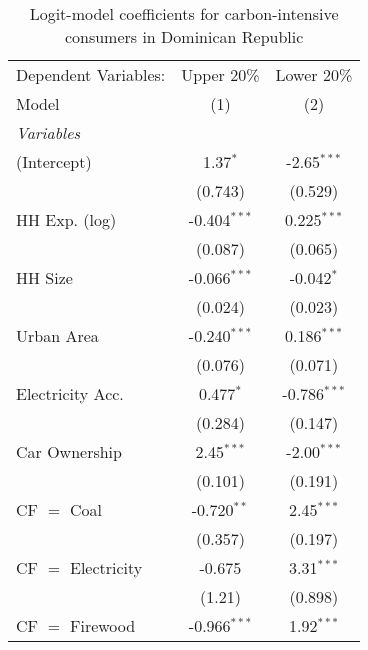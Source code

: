 
\begin{table}[htbp!]
   \centering
   \small
   \begin{adjustbox}{width = 1\textwidth, max height = 0.95\textheight, center}
      \begin{threeparttable}[b]
         \caption{\label{tab:Logit_1_DOM} Logit-model coefficients for carbon-intensive consumers in Dominican Republic}
         \begin{tabular}{lcc}
            \tabularnewline \midrule \midrule
            Dependent Variables: & Upper 20\%     & Lower 20\%\\   
            Model                & (1)            & (2)\\  
            \midrule
            \emph{Variables}\\
            (Intercept)          & 1.37$^{*}$     & -2.65$^{***}$\\   
                                 & (0.743)        & (0.529)\\   
            HH Exp. (log)        & -0.404$^{***}$ & 0.225$^{***}$\\   
                                 & (0.087)        & (0.065)\\   
            HH Size              & -0.066$^{***}$ & -0.042$^{*}$\\   
                                 & (0.024)        & (0.023)\\   
            Urban Area           & -0.240$^{***}$ & 0.186$^{***}$\\   
                                 & (0.076)        & (0.071)\\   
            Electricity Acc.     & 0.477$^{*}$    & -0.786$^{***}$\\   
                                 & (0.284)        & (0.147)\\   
            Car Ownership        & 2.45$^{***}$   & -2.00$^{***}$\\   
                                 & (0.101)        & (0.191)\\   
            CF $=$ Coal          & -0.720$^{**}$  & 2.45$^{***}$\\   
                                 & (0.357)        & (0.197)\\   
            CF $=$ Electricity   & -0.675         & 3.31$^{***}$\\   
                                 & (1.21)         & (0.898)\\   
            CF $=$ Firewood      & -0.966$^{***}$ & 1.92$^{***}$\\   

\end{tabular}
\end{threeparttable}
\end{adjustbox}
\end{table}
